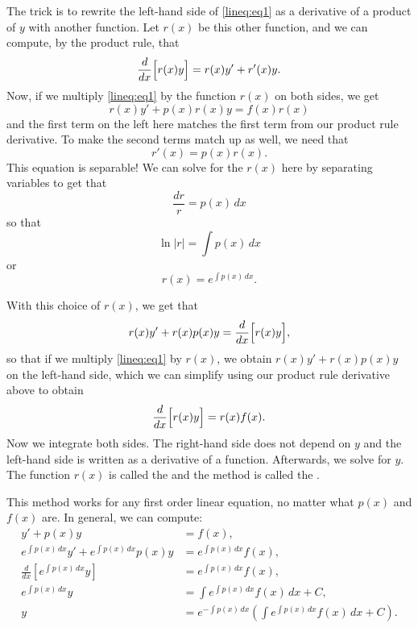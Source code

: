 The trick is to rewrite the left-hand side
of \eqref{lineq:eq1} as a derivative of a product of $y$ with another
function. Let $r(x)$ be this other function, and we can compute, by the product rule, that
\begin{equation*}
\frac{d}{dx}\Bigl[r(x)y\Bigr] = r(x)y' + r'(x) y.
\end{equation*}
Now, if we multiply \eqref{lineq:eq1} by the function $r(x)$ on both sides, we get
\begin{equation*}
r(x)y' + p(x)r(x)y = f(x)r(x)
\end{equation*}
and the first term on the left here matches the first term from our product rule derivative. To make the second terms match up as well, we need that
\begin{equation*}
r'(x) = p(x)r(x).
\end{equation*}
This equation is separable! We can solve for the $r(x)$ here by separating variables to get that
\begin{equation*}
\frac{dr}{r} = p(x)\, dx
\end{equation*}
so that 
\begin{equation*}
\ln{|r|} = \int p(x)\, dx
\end{equation*}
or 
\begin{equation*}
r(x) = e^{\int p(x) \,dx} .
\end{equation*}

With this choice of $r(x)$, we get that 
\begin{equation*}
r(x) y' + r(x) p(x) y = \frac{d}{dx}\Bigl[ r(x) y \Bigr], 
\end{equation*}
so that if we multiply \eqref{lineq:eq1} by
$r(x)$, we obtain $r(x) y' + r(x) p(x) y$ on the left-hand side, which we can simplify using our product rule derivative above to obtain
\begin{equation*}
 \frac{d}{dx}\Bigl[ r(x) y \Bigr] = r(x)f(x) .
\end{equation*}
Now we integrate both sides.
The right-hand side does not depend on $y$ and the left-hand side
is written as a derivative of a function.  Afterwards, we solve for $y$.
The function $r(x)$ is called the \emph{} and the
method is called the \emph{}.

This method works for any first order linear equation, no matter what $p(x)$ and $f(x)$ are. In general, we can compute:
\begin{align*}
y' + p(x) y &= f(x) , \\
e^{\int p(x) \,dx} y' + e^{\int p(x) \,dx} p(x) y & = e^{\int p(x) \,dx} f(x) , \\
\frac{d}{dx}\left[ e^{\int p(x) \,dx} y \right] & = e^{\int p(x) \,dx} f(x) , \\
e^{\int p(x) \,dx} y & = \int e^{\int p(x) \,dx} f(x) \,dx + C , \\
y & = e^{-\int p(x) \,dx} \left( \int e^{\int p(x) \,dx} f(x) \,dx + C \right) .
\end{align*}

